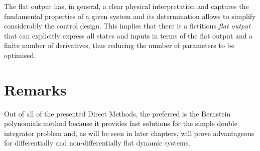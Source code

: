 \par The flat output has, in general, a clear physical interpretation and captures the fundamental properties of a given system and its determination allows to simplify considerably the control design. This implies that there is a fictitious \textit{flat output} that can explicitly express all states and inputs in terms of the flat output and a finite number of derivatives, thus reducing the number of parameters to be optimised.



\section{Remarks}

\par Out of all of the presented Direct Methods, the preferred is the Bernstein polynomials method because it provides fast solutions for the simple double integrator problem and, as will be seen in later chapters, will prove advantageous for differentially and non-differentially flat dynamic systems.
